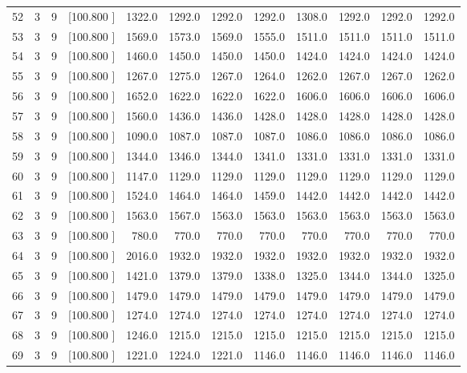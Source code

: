 \documentclass[12pt,a4paper]{article}
\begin{document}
\begin{center}
{\begin{tabular}{r r r r r r r r r r r r}
  52&  3&  9&[100.800   ]&  1322.0&  1292.0&  1292.0&  1292.0&  1308.0&  1292.0&  1292.0&  1292.0\\[-0.02in]
  53&  3&  9&[100.800   ]&  1569.0&  1573.0&  1569.0&  1555.0&  1511.0&  1511.0&  1511.0&  1511.0\\[-0.02in]
  54&  3&  9&[100.800   ]&  1460.0&  1450.0&  1450.0&  1450.0&  1424.0&  1424.0&  1424.0&  1424.0\\[-0.02in]
  55&  3&  9&[100.800   ]&  1267.0&  1275.0&  1267.0&  1264.0&  1262.0&  1267.0&  1267.0&  1262.0\\[-0.02in]
  56&  3&  9&[100.800   ]&  1652.0&  1622.0&  1622.0&  1622.0&  1606.0&  1606.0&  1606.0&  1606.0\\[-0.02in]
  57&  3&  9&[100.800   ]&  1560.0&  1436.0&  1436.0&  1428.0&  1428.0&  1428.0&  1428.0&  1428.0\\[-0.02in]
  58&  3&  9&[100.800   ]&  1090.0&  1087.0&  1087.0&  1087.0&  1086.0&  1086.0&  1086.0&  1086.0\\[-0.02in]
  59&  3&  9&[100.800   ]&  1344.0&  1346.0&  1344.0&  1341.0&  1331.0&  1331.0&  1331.0&  1331.0\\[-0.02in]
  60&  3&  9&[100.800   ]&  1147.0&  1129.0&  1129.0&  1129.0&  1129.0&  1129.0&  1129.0&  1129.0\\[-0.02in]
  61&  3&  9&[100.800   ]&  1524.0&  1464.0&  1464.0&  1459.0&  1442.0&  1442.0&  1442.0&  1442.0\\[-0.02in]
  62&  3&  9&[100.800   ]&  1563.0&  1567.0&  1563.0&  1563.0&  1563.0&  1563.0&  1563.0&  1563.0\\[-0.02in]
  63&  3&  9&[100.800   ]&   780.0&   770.0&   770.0&   770.0&   770.0&   770.0&   770.0&   770.0\\[-0.02in]
  64&  3&  9&[100.800   ]&  2016.0&  1932.0&  1932.0&  1932.0&  1932.0&  1932.0&  1932.0&  1932.0\\[-0.02in]
  65&  3&  9&[100.800   ]&  1421.0&  1379.0&  1379.0&  1338.0&  1325.0&  1344.0&  1344.0&  1325.0\\[-0.02in]
  66&  3&  9&[100.800   ]&  1479.0&  1479.0&  1479.0&  1479.0&  1479.0&  1479.0&  1479.0&  1479.0\\[-0.02in]
  67&  3&  9&[100.800   ]&  1274.0&  1274.0&  1274.0&  1274.0&  1274.0&  1274.0&  1274.0&  1274.0\\[-0.02in]
  68&  3&  9&[100.800   ]&  1246.0&  1215.0&  1215.0&  1215.0&  1215.0&  1215.0&  1215.0&  1215.0\\[-0.02in]
  69&  3&  9&[100.800   ]&  1221.0&  1224.0&  1221.0&  1146.0&  1146.0&  1146.0&  1146.0&  1146.0\\[-0.02in]

\end{tabular}}
\end{center}
\end{document}

